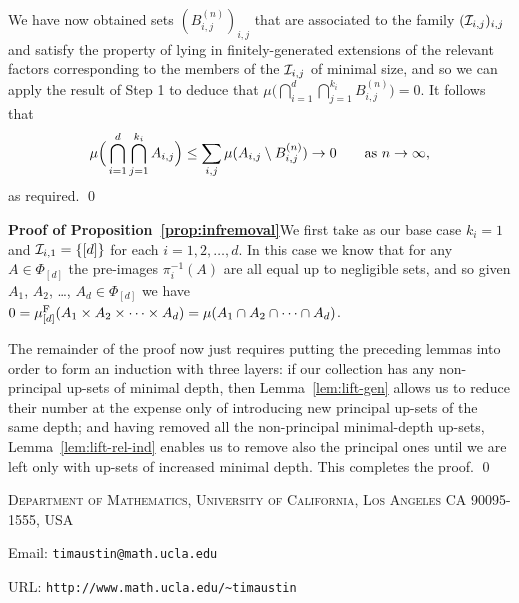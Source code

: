 \documentclass[12pt]{article}
\begin{document}
We have now obtained sets $(B^{(n)}_{i,j})_{i,j}$ that are
associated to the family $(\I_{i,j})_{i,j}$ and satisfy the property
of lying in finitely-generated extensions of the relevant factors
corresponding to the members of the $\I_{i,j}$ of minimal size, and
so we can apply the result of Step 1 to deduce that
$\mu\big(\bigcap_{i=1}^d\bigcap_{j=1}^{k_i}B^{(n)}_{i,j}\big) = 0$.
It follows that
\[\mu\Big(\bigcap_{i=1}^d\bigcap_{j=1}^{k_i}A_{i,j}\Big) \leq \sum_{i,j}\mu(A_{i,j}\setminus B^{(n)}_{i,j}) \to 0\quad\quad\hbox{as }n\to\infty,\]
as required. \qed

\textbf{Proof of Proposition~\ref{prop:infremoval}}\quad We first
take as our base case $k_i = 1$ and $\I_{i,1} = \{[d]\}$ for each
$i=1,2,\ldots,d$.  In this case we know that for any $A \in
\Phi_{[d]}$ the pre-images $\pi_i^{-1}(A)$ are all equal up to
negligible sets, and so given $A_1$, $A_2$, \ldots, $A_d \in
\Phi_{[d]}$ we have $0 = \mu^{\rm{F}}_{[d]}(A_1\times
A_2\times\cdots\times A_d) = \mu(A_1\cap A_2\cap\cdots\cap A_d)$.

The remainder of the proof now just requires putting the preceding
lemmas into order to form an induction with three layers: if our
collection has any non-principal up-sets of minimal depth, then
Lemma~\ref{lem:lift-gen} allows us to reduce their number at the
expense only of introducing new principal up-sets of the same depth;
and having removed all the non-principal minimal-depth up-sets,
Lemma~\ref{lem:lift-rel-ind} enables us to remove also the principal
ones until we are left only with up-sets of increased minimal depth.
This completes the proof. \qed

\parskip 0pt




\vspace{10pt}

\small{\textsc{Department of Mathematics, University of California,
Los Angeles CA 90095-1555, USA}}

\vspace{5pt}

\small{Email: \verb|timaustin@math.ucla.edu|}

\vspace{5pt}

\small{URL: \verb|http://www.math.ucla.edu/~timaustin|}
\end{document}
